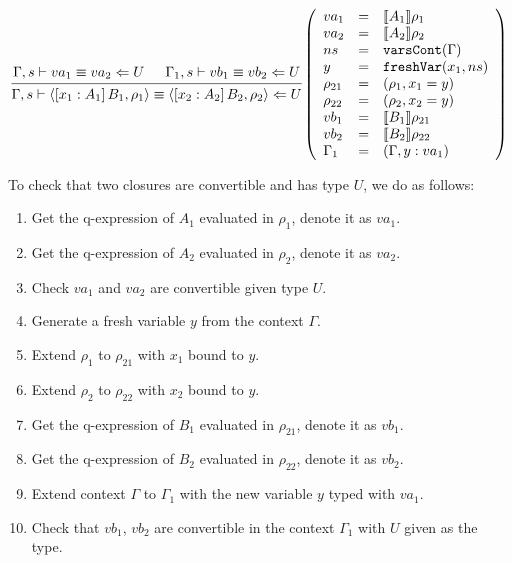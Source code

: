 \documentclass{article}
\theoremstyle{remark}
\begin{document}
\begin{align}
  \begin{prooftree}
    \hypo{\Gamma,s \vdash va_1 \equiv va_2 \Leftarrow U}
    \hypo{\Gamma_1,s \vdash vb_1 \equiv vb_2 \Leftarrow U}
    \infer2{\Gamma,s \vdash \langle [x_1 : A_1] \, B_1, \rho_1 \rangle \equiv \langle [x_2 : A_2] \, B_2, \rho_2 \rangle \Leftarrow U} 
  \end{prooftree}\left(\begin{array}{l l l}
                         va_1 &= & \llbracket A_1 \rrbracket \rho_1 \\ 
                         va_2 &= & \llbracket A_2 \rrbracket \rho_2 \\ 
                         ns &= & \texttt{varsCont}(\Gamma) \\
                         y &= & \texttt{freshVar}(x_1, ns) \\
                         \rho_{21} &= & (\rho_1, x_1 = y) \\
                         \rho_{22} &= & (\rho_2, x_2 = y) \\
                         vb_1 &= & \llbracket B_1 \rrbracket \rho_{21} \\
                         vb_2 &= & \llbracket B_2 \rrbracket \rho_{22} \\
                         \Gamma_1 &= & (\Gamma, y : va_1)
                       \end{array}\right)
\end{align}

To check that two closures are convertible and has type $U$, we do as follows:
\begin{enumerate}
\item Get the q-expression of $A_1$ evaluated in $\rho_1$, denote it as $va_1$.
\item Get the q-expression of $A_2$ evaluated in $\rho_2$, denote it as $va_2$.
\item Check $va_1$ and $va_2$ are convertible given type $U$.
\item Generate a fresh variable $y$ from the context $\Gamma$.
\item Extend $\rho_1$ to $\rho_{21}$ with $x_1$ bound to $y$.
\item Extend $\rho_2$ to $\rho_{22}$ with $x_2$ bound to $y$.
\item Get the q-expression of $B_1$ evaluated in $\rho_{21}$, denote it as $vb_1$.
\item Get the q-expression of $B_2$ evaluated in $\rho_{22}$, denote it as $vb_2$.
\item Extend context $\Gamma$ to $\Gamma_1$ with the new variable $y$ typed with $va_1$.
\item Check that $vb_1$, $vb_2$ are convertible in the context $\Gamma_1$ with $U$ given as the type.
\end{enumerate}
\end{document}
